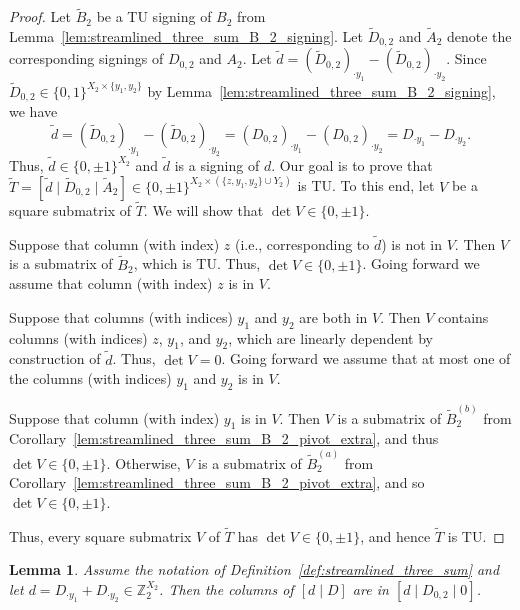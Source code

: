\documentclass{article}
\newtheorem{lemma}{Lemma}
\theoremstyle{definition}
\begin{document}
\begin{proof}
    Let $\tilde{B}_{2}$ be a TU signing of $B_{2}$ from Lemma~\ref{lem:streamlined_three_sum_B_2_signing}. Let $\tilde{D}_{0, 2}$ and $\tilde{A}_{2}$ denote the corresponding signings of $D_{0, 2}$ and $A_{2}$. Let $\tilde{d} = (\tilde{D}_{0, 2})_{\cdot y_{1}} - (\tilde{D}_{0, 2})_{\cdot y_{2}}$. Since $\tilde{D}_{0, 2} \in \{0, 1\}^{X_{2} \times \{y_{1}, y_{2}\}}$ by Lemma~\ref{lem:streamlined_three_sum_B_2_signing}, we have
    \[
        \tilde{d} = (\tilde{D}_{0, 2})_{\cdot y_{1}} - (\tilde{D}_{0, 2})_{\cdot y_{2}} = (D_{0, 2})_{\cdot y_{1}} - (D_{0, 2})_{\cdot y_{2}} = D_{\cdot y_{1}} - D_{\cdot y_{2}}.
    \]
    Thus, $\tilde{d} \in \{0, \pm 1\}^{X_{2}}$ and $\tilde{d}$ is a signing of $d$. Our goal is to prove that $\tilde{T} = [\tilde{d} \mid \tilde{D}_{0, 2} \mid \tilde{A}_{2}] \in \{0, \pm 1\}^{X_{2} \times (\{z, y_{1}, y_{2}\} \cup Y_{2})}$ is TU. To this end, let $V$ be a square submatrix of $\tilde{T}$. We will show that $\det V \in \{0, \pm 1\}$.

    Suppose that column (with index) $z$ (i.e., corresponding to $\tilde{d}$) is not in $V$. Then $V$ is a submatrix of $\tilde{B}_{2}$, which is TU. Thus, $\det V \in \{0, \pm 1\}$. Going forward we assume that column (with index) $z$ is in $V$.

    Suppose that columns (with indices) $y_{1}$ and $y_{2}$ are both in $V$. Then $V$ contains columns (with indices) $z$, $y_{1}$, and $y_{2}$, which are linearly dependent by construction of $\tilde{d}$. Thus, $\det V = 0$. Going forward we assume that at most one of the columns (with indices) $y_{1}$ and $y_{2}$ is in $V$.

    Suppose that column (with index) $y_{1}$ is in $V$. Then $V$ is a submatrix of $\tilde{B}_{2}^{(b)}$ from Corollary~\ref{lem:streamlined_three_sum_B_2_pivot_extra}, and thus $\det V \in \{0, \pm 1\}$. Otherwise, $V$ is a submatrix of $\tilde{B}_{2}^{(a)}$ from Corollary~\ref{lem:streamlined_three_sum_B_2_pivot_extra}, and so $\det V \in \{0, \pm 1\}$.

    Thus, every square submatrix $V$ of $\tilde{T}$ has $\det V \in \{0, \pm 1\}$, and hence $\tilde{T}$ is TU.
\end{proof}

\begin{lemma}\label{lem:three_sum_columns_of_d_D}
    Assume the notation of Definition~\ref{def:streamlined_three_sum} and let $d = D_{\cdot y_{1}} + D_{\cdot y_{2}} \in \mathbb{Z}_{2}^{X_{2}}$. Then the columns of $[d \mid D]$ are in $[d \mid D_{0, 2} \mid 0]$.
\end{lemma}
\end{document}
